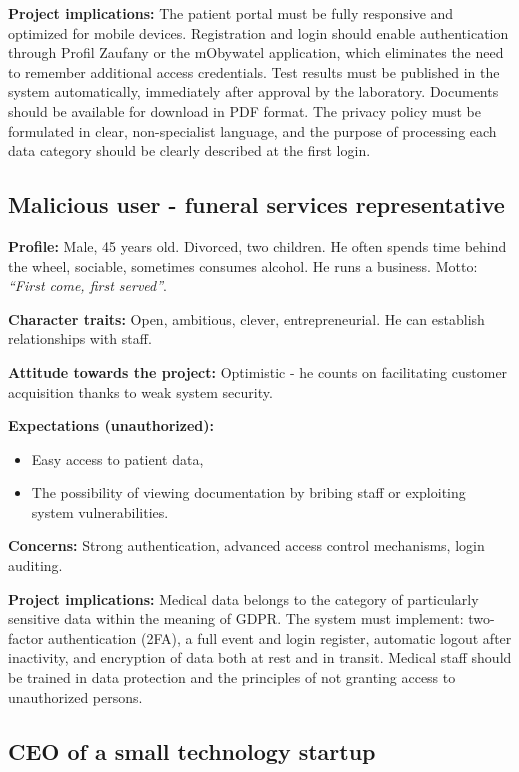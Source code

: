 \textbf{Project implications:} The patient portal must be fully responsive and optimized
for mobile devices. Registration and login should enable authentication
through Profil Zaufany or the mObywatel application, which eliminates the need to remember
additional access credentials. Test results must be published in the system
automatically, immediately after approval by the laboratory. Documents should
be available for download in PDF format. The privacy policy must be formulated
in clear, non-specialist language, and the purpose of processing each data category should be clearly described at the first login.

\subsection{Malicious user - funeral services representative}

\textbf{Profile:} Male, 45 years old. Divorced, two children. He often spends time behind the wheel, sociable, sometimes consumes alcohol. He runs a business. Motto: \emph{``First come, first served''}.

\textbf{Character traits:} Open, ambitious, clever, entrepreneurial. He can establish relationships with staff.

\textbf{Attitude towards the project:} Optimistic - he counts on facilitating customer acquisition thanks to weak system security.

\textbf{Expectations (unauthorized):}
\begin{itemize}
    \item Easy access to patient data,
    \item The possibility of viewing documentation by bribing staff or exploiting system vulnerabilities.
\end{itemize}

\textbf{Concerns:} Strong authentication, advanced access control mechanisms, login auditing.

\textbf{Project implications:} Medical data belongs to the category of particularly sensitive data within the meaning of GDPR. The system must implement: two-factor authentication (2FA), a full event and login register, automatic logout after inactivity, and encryption of data both at rest and in transit. Medical staff should be trained in data protection and the principles of not granting access to unauthorized persons.

\subsection{CEO of a small technology startup}

